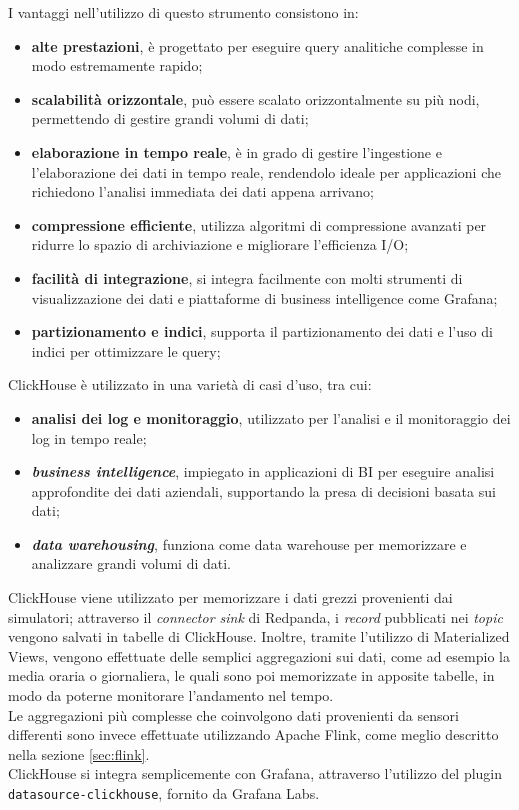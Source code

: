 I vantaggi nell'utilizzo di questo strumento consistono in:
\begin{itemize}
	\item \textbf{alte prestazioni}, è progettato per eseguire query analitiche complesse in modo estremamente rapido;
	\item \textbf{scalabilità orizzontale}, può essere scalato orizzontalmente su più nodi, permettendo di gestire grandi volumi di dati;
	\item \textbf{elaborazione in tempo reale}, è in grado di gestire l'ingestione e l'elaborazione dei dati in tempo reale, rendendolo ideale per applicazioni che richiedono l'analisi immediata dei dati appena arrivano;
	\item \textbf{compressione efficiente}, utilizza algoritmi di compressione avanzati per ridurre lo spazio di archiviazione e migliorare l'efficienza I/O;
	\item \textbf{facilità di integrazione}, si integra facilmente con molti strumenti di visualizzazione dei dati e piattaforme di business intelligence come Grafana;
	\item \textbf{partizionamento e indici}, supporta il partizionamento dei dati e l'uso di indici per ottimizzare le query;
\end{itemize}
ClickHouse è utilizzato in una varietà di casi d'uso, tra cui:
\begin{itemize}
	\item \textbf{analisi dei log e monitoraggio}, utilizzato per l'analisi e il monitoraggio dei log in tempo reale;
	\item \textbf{\textit{business intelligence}}, impiegato in applicazioni di BI per eseguire analisi approfondite dei dati aziendali, supportando la presa di decisioni basata sui dati;
	\item \textbf{\textit{data warehousing}}, funziona come data warehouse per memorizzare e analizzare grandi volumi di dati.
\end{itemize}
ClickHouse viene utilizzato per memorizzare i dati grezzi provenienti dai simulatori; attraverso il \textit{connector sink} di Redpanda, i \textit{record} pubblicati nei \textit{topic} vengono
salvati in tabelle di ClickHouse.
Inoltre, tramite l'utilizzo di Materialized Views, vengono effettuate delle semplici aggregazioni sui dati, come ad esempio la media oraria o giornaliera, le quali sono poi memorizzate in apposite tabelle,
in modo da poterne monitorare l'andamento nel tempo.\\
Le aggregazioni più complesse che coinvolgono dati provenienti da sensori differenti sono invece effettuate utilizzando Apache Flink, come meglio descritto nella sezione \ref{sec:flink}.\\
ClickHouse si integra semplicemente con Grafana, attraverso l'utilizzo del plugin \\
\texttt{datasource-clickhouse}, fornito da Grafana Labs.

